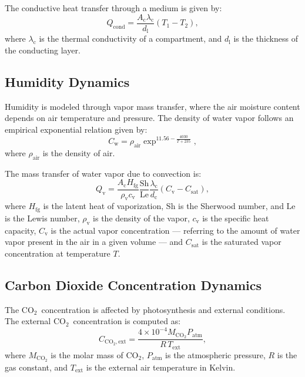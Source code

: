\documentclass[conference]{IEEEtran}
\newcommand{\ui}[2]{#1_{\mathrm{#2}}}
\newcommand{\coo}{\ensuremath{\mathrm{CO_2}}}
\begin{document}
The conductive heat transfer through a medium is given by:
\begin{equation}
    \ui{Q}{cond} = \frac{\ui{A}{c} \ui{\lambda}{c}}{\ui{d}{l}} (\ui{T}{1} - \ui{T}{2}),
\end{equation}
where \(\ui{\lambda}{c} \) is the thermal conductivity of a compartment, and \(\ui{d}{l}\) is the thickness of the conducting layer.

\subsection{Humidity Dynamics}\label{subsec:humidity}

Humidity is modeled through vapor mass transfer, where the air moisture content depends on air temperature and pressure. The density of water vapor follows an empirical exponential relation given by:
\begin{equation}
    \ui{C}{w} = \ui{\rho}{air} \exp^{11.56 - \frac{4030}{T + 235}},
\end{equation}
where \(\ui{\rho}{air}\) is the density of air.

The mass transfer of water vapor due to convection is:
\begin{equation}
    \ui{Q}{v} = \frac{\ui{A}{c} \ui{H}{fg}}{\ui{\rho}{v} \ui{c}{v}}  \frac{\mathrm{Sh}}{\mathrm{Le}}  \frac{\ui{\lambda}{c}}{\ui{d}{c}}  \left( \ui{C}{v} - \ui{C}{sat} \right),
\end{equation}
where \(\ui{H}{fg}\) is the latent heat of vaporization, \(\mathrm{Sh}\) is the Sherwood number, and \(\mathrm{Le}\) is the Lewis number, \(\ui{\rho}{v} \) is the density of the vapor, \(\ui{c}{v}\) is the specific heat capacity, \(\ui{C}{v}\) is the actual vapor concentration --- referring  to the amount of water vapor present in the air in a given volume --- and \(\ui{C}{sat}\) is the saturated vapor concentration at temperature \(T\).

\subsection{Carbon Dioxide Concentration Dynamics}

The \coo\ concentration is affected by photosynthesis and external conditions. The external \coo\ concentration is computed as:
\begin{equation}
    \ui{C}{\coo,ext} = \frac{4 \times 10^{-4}  M_{\coo}  \ui{P}{atm}}{R\,\ui{T}{ext}},
\end{equation}
where \(M_{\coo}\) is the molar mass of \coo, \(\ui{P}{atm}\) is the atmospheric pressure, \(R\) is the gas constant, and \(\ui{T}{ext}\) is the external air temperature in Kelvin.
\end{document}
